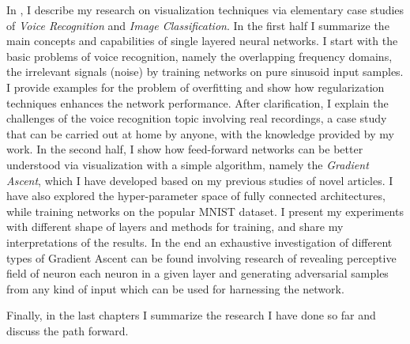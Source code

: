 In \textbf{}, I describe my research on 
visualization techniques via elementary case studies of \emph{Voice 
Recognition} and \emph{Image Classification}.
In the first half I summarize the main concepts and capabilities of single 
layered neural networks.
I start with the basic problems of voice recognition, namely the 
overlapping frequency domains, the irrelevant signals (noise) by training 
networks on pure sinusoid input samples.
I provide examples for the problem of overfitting and show how regularization techniques enhances the network performance.
After clarification, I explain the challenges of the voice recognition topic involving real recordings,
a case study that can be carried out at home by anyone, with the knowledge 
provided by my work.
In the second half, I show how feed-forward networks can be better understood via visualization with a simple algorithm, namely the \emph{Gradient Ascent}, which I have developed based on my previous studies of novel articles.
I have also explored the hyper-parameter space of fully connected architectures,
while training networks on the popular MNIST dataset.
I present my experiments with different shape of layers and methods for training, and share my interpretations of the results.
In the end an exhaustive investigation of different types of Gradient Ascent can be found involving research of revealing perceptive field of neuron each neuron in a given layer and generating adversarial samples from any kind of input which can be used for harnessing the network.

Finally, in the last chapters I summarize the research I have done so far and discuss the path forward.





%

